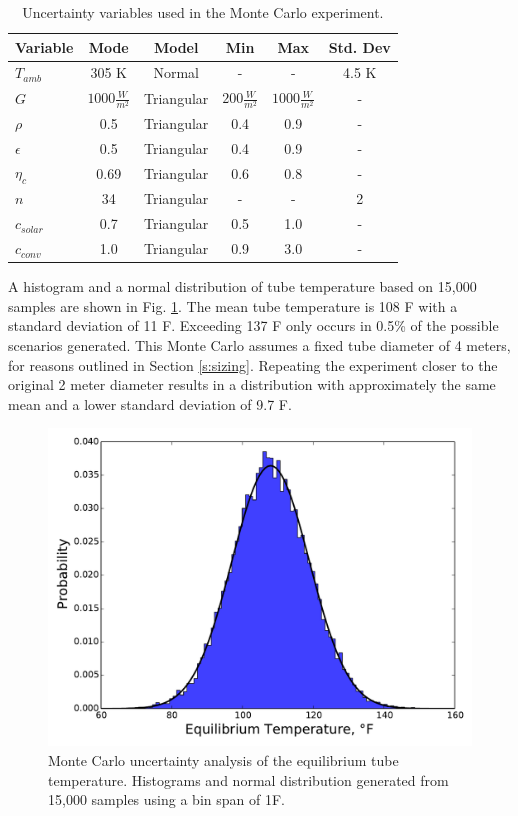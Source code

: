 \documentclass[heading.tex]{subfiles}
\begin{document}
\begin{table}[hbtp]

    \centering
    \caption{Uncertainty variables used in the Monte Carlo experiment.}
    \label{tab:montecarlo}
    \begin{tabulary}{1.0\textwidth}{l  c  c  c c c} 
        \hline
        Variable & Mode & Model & Min & Max & Std. Dev\\ \hline \hline
        $T_{amb}$ & 305 K & Normal & - & - & 4.5 K \\ 
        $G$ & $1000\frac{W}{m^{2}}$ & Triangular & $200\frac{W}{m^{2}}$ & $1000\frac{W}{m^{2}}$ & - \\
        $\rho$ & 0.5 & Triangular & 0.4 & 0.9 & - \\
        $\epsilon$ & 0.5 & Triangular & 0.4 & 0.9 & - \\
        $\eta_{c}$ & 0.69 & Triangular & 0.6 & 0.8 & - \\
        $n$ & 34 & Triangular & - & - & 2 \\
        $c_{solar}$ & 0.7 & Triangular & 0.5 & 1.0 & - \\
        $c_{conv}$ & 1.0 & Triangular & 0.9 & 3.0 & - \\
        \hline
    \end{tabulary}
    
\end{table}


A histogram and a normal distribution of tube temperature
based on 15,000 samples are shown in Fig. \ref{f:montecarlo}.
The mean tube temperature is 108 \degree F with a standard deviation of 11 \degree F.
Exceeding 137 \degree F only occurs in 0.5\% of the possible scenarios generated.
This Monte Carlo assumes a fixed tube diameter of 4 meters,
for reasons outlined in Section \ref{s:sizing}.
Repeating the experiment closer to the original 2 meter diameter results in
a distribution with approximately the same mean and a lower standard deviation
of 9.7 \degree F.

\begin{figure}[hbtp]
\centering
\includegraphics[width=.9\textwidth]{images/histo.pdf}
 \caption[MonteCarlo]{Monte Carlo uncertainty analysis of the equilibrium tube temperature.
 Histograms and normal distribution generated from 15,000 samples
 using a bin span of 1\degree F.}
\label{f:montecarlo}
\end{figure}
\end{document}
